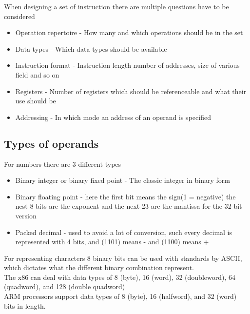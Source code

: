 \documentclass[12pt, a4paper]{article}
\begin{document}
			When designing a set of instruction there are multiple questions have to be considered
			\begin{itemize}
				\item Operation repertoire - How many and which operations should be in the set
				\item Data types - Which data types should be available
				\item Instruction format - Instruction length number of addresses, size of various field and so on
				\item Registers - Number of registers which should be referenceable and what their use should be
				\item Addressing - In which mode an address of an operand is specified
			\end{itemize}
		\subsection{Types of operands}
			For numbers there are 3 different types 
			\begin{itemize}
				\item Binary integer or binary fixed point - The classic integer in binary form
				\item Binary floating point - here the first bit means the sign(1 = negative) the nest 8 bits are the exponent and the next 23 are the mantissa for the 32-bit version
				\item Packed decimal - used to avoid a lot of conversion, such every decimal is represented with 4 bits, and (1101) means - and (1100) means +
			\end{itemize}
			For representing characters 8 binary bits can be used with standards by ASCII, which dictates what the different binary combination represent.\\
			The x86 can deal with data types of 8 (byte), 16 (word), 32 (doubleword), 64 (quadword), and 128 (double quadword)\\
			ARM processors support data types of 8 (byte), 16 (halfword), and 32 (word) bits in length.\\
\end{document}
